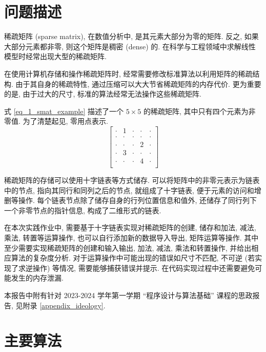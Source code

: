 \section{问题描述}

稀疏矩阵 (sparse matrix), 在数值分析中, 是其元素大部分为零的矩阵. 反之, 如果大部分元素都非零, 则这个矩阵是稠密 (dense) 的. 在科学与工程领域中求解线性模型时经常出现大型的稀疏矩阵.

在使用计算机存储和操作稀疏矩阵时, 经常需要修改标准算法以利用矩阵的稀疏结构. 由于其自身的稀疏特性, 通过压缩可以大大节省稀疏矩阵的内存代价. 更为重要的是, 由于过大的尺寸, 标准的算法经常无法操作这些稀疏矩阵.

式 \ref{eq_1_smat_example} 描述了一个 $5 \times 5$ 的稀疏矩阵, 其中只有四个元素为非零值. 为了清楚起见, 零用点表示.
\begin{equation}
    \begin{bmatrix}
        \cdot & 1 & \cdot & \cdot & \cdot \\
        \cdot & \cdot & \cdot & \cdot & \cdot \\
        \cdot & \cdot & \cdot & 2 & \cdot \\
        \cdot & 3 & \cdot & \cdot & \cdot \\
        \cdot & \cdot & \cdot & 4 & \cdot \\
    \end{bmatrix}
    \label{eq_1_smat_example}
\end{equation}

稀疏矩阵的存储可以使用十字链表等方式储存. 可以将矩阵中的非零元表示为链表中的节点, 指向其同行和同列之后的节点, 就组成了十字链表, 便于元素的访问和增删等操作. 每个链表节点除了储存自身的行列位置信息和值外, 还储存了同行列下一个非零节点的指针信息, 构成了二维形式的链表.

在本次实践作业中, 需要基于十字链表实现对稀疏矩阵的创建, 储存和加法, 减法, 乘法, 转置等运算操作, 也可以自行添加新的数据导入导出, 矩阵运算等操作. 其中至少需要实现稀疏矩阵的创建和输入输出, 加法, 减法, 乘法和转置操作, 并给出相应算法的复杂度分析. 对于运算操作中可能出现的错误如尺寸不匹配, 不可逆 (若实现了求逆操作) 等情况, 需要能够捕获错误并提示. 在代码实现过程中还需要避免可能发生的内存泄漏.

本报告中附有针对 2023-2024 学年第一学期 “程序设计与算法基础” 课程的思政报告, 见附录 \ref{appendix_ideology}.

\section{主要算法}

